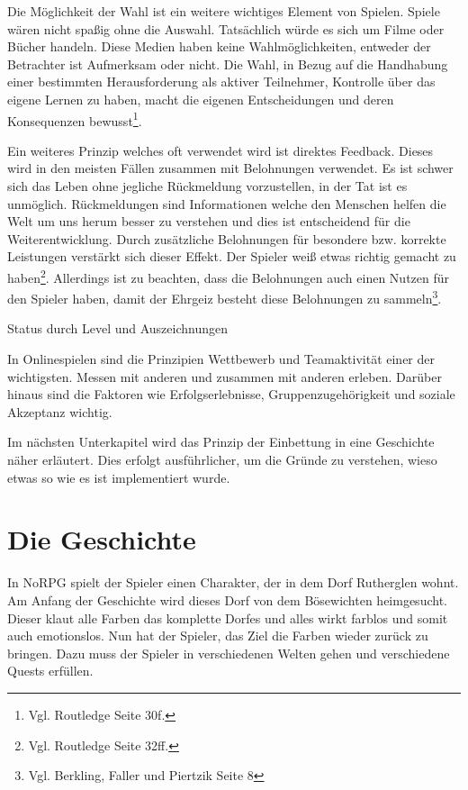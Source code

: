 Die Möglichkeit der Wahl ist ein weitere wichtiges Element von Spielen. Spiele wären nicht spaßig ohne die Auswahl. Tatsächlich würde es sich um Filme oder Bücher handeln. Diese Medien haben keine Wahlmöglichkeiten, entweder der Betrachter ist Aufmerksam oder nicht. Die Wahl, in Bezug auf die Handhabung einer bestimmten Herausforderung als aktiver Teilnehmer, Kontrolle über das eigene Lernen zu haben, macht die eigenen Entscheidungen und deren Konsequenzen bewusst\footnote{Vgl. Routledge \cite{seriousGamesPrinciples} Seite 30f.}.

Ein weiteres Prinzip welches oft verwendet wird ist direktes Feedback. Dieses wird in den meisten Fällen zusammen mit Belohnungen verwendet. Es ist schwer sich das Leben ohne jegliche Rückmeldung vorzustellen, in der Tat ist es unmöglich. Rückmeldungen sind Informationen welche den Menschen helfen die Welt um uns herum besser zu verstehen und dies ist entscheidend für die Weiterentwicklung. Durch zusätzliche Belohnungen für besondere bzw. korrekte Leistungen verstärkt sich dieser Effekt. Der Spieler weiß etwas richtig gemacht zu haben\footnote{Vgl. Routledge \cite{seriousGamesPrinciples} Seite 32ff.}. Allerdings ist zu beachten, dass die Belohnungen auch einen Nutzen für den Spieler haben, damit der Ehrgeiz besteht diese Belohnungen zu sammeln\footnote{Vgl. Berkling, Faller und Piertzik \cite{gamesPaper} Seite 8}.

Status durch Level und Auszeichnungen

In Onlinespielen sind die Prinzipien Wettbewerb und Teamaktivität einer der wichtigsten. Messen mit anderen und zusammen mit anderen erleben. Darüber hinaus sind die Faktoren wie Erfolgserlebnisse, Gruppenzugehörigkeit und soziale Akzeptanz wichtig. 

Im nächsten Unterkapitel wird das Prinzip der Einbettung in eine Geschichte näher erläutert. Dies erfolgt ausführlicher, um die Gründe zu verstehen, wieso etwas so wie es ist implementiert wurde.
	
\section{Die Geschichte}
In NoRPG spielt der Spieler einen Charakter, der in dem Dorf Rutherglen wohnt. Am Anfang der Geschichte wird dieses Dorf von dem Bösewichten heimgesucht. Dieser klaut alle Farben das komplette Dorfes und alles wirkt farblos und somit auch emotionslos. Nun hat der Spieler, das Ziel die Farben wieder zurück zu bringen. Dazu muss der Spieler in verschiedenen Welten gehen und verschiedene Quests erfüllen.

